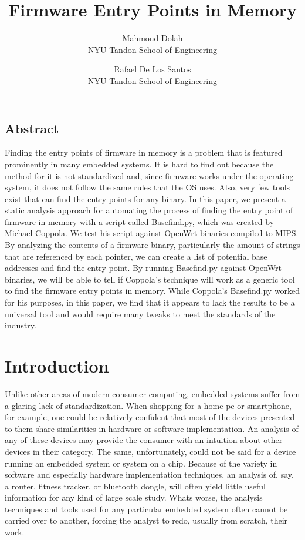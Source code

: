 \documentclass[letterpaper,twocolumn,10pt]{article}
\begin{document}
\title{\Large \bf Firmware Entry Points in Memory}
\author{
    {\rm Mahmoud Dolah}\\
    NYU Tandon School of Engineering
    \and
    {\rm Rafael De Los Santos}\\
    NYU Tandon School of Engineering
}

\date{}

\maketitle

\thispagestyle{empty}

\subsection*{Abstract}
Finding the entry points of firmware in memory is a problem that is featured prominently in many embedded systems. It is hard to find out because the method for it is not standardized and, since firmware works under the operating system, it does not follow the same rules that the OS uses. Also, very few tools exist that can find the entry points for any binary. In this paper, we present a static analysis approach for automating the process of finding the entry point of firmware in memory with a script called Basefind.py, which was created by Michael Coppola. We test his script against OpenWrt binaries compiled to MIPS. By analyzing the contents of a firmware binary, particularly the amount of strings that are referenced by each pointer, we can create a list of potential base addresses and find the entry point. By running Basefind.py against OpenWrt binaries, we will be able to tell if Coppola's technique will work as a generic tool to find the firmware entry points in memory. While Coppola's Basefind.py worked for his purposes, in this paper, we find that it appears to lack the results to be a universal tool and would require many tweaks to meet the standards of the industry. 

\section{Introduction}
Unlike other areas of modern consumer computing, embedded systems suffer from a glaring lack of standardization. When shopping for a home pc or smartphone, for example, one could be relatively confident that most of the devices presented to them share similarities in hardware or software implementation. An analysis of any of these devices may provide the consumer with an intuition about other devices in their category. The same, unfortunately, could not be said for a device running an embedded system or system on a chip. Because of the variety in software and especially hardware implementation techniques, an analysis of, say, a router, fitness tracker, or bluetooth dongle, will often yield little useful information for any kind of large scale study. Whats worse, the analysis techniques and tools used for any particular embedded system often cannot be carried over to another, forcing the analyst to redo, usually from scratch, their work.
\end{document}
